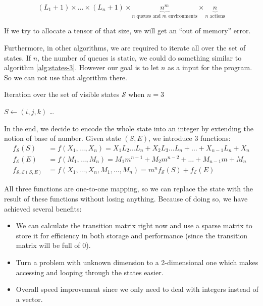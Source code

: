 \documentclass[
  a4paper, xcolor = usenames,dvipsnames]{article}
\providecommand{\tightlist}{%
  \setlength{\itemsep}{0pt}\setlength{\parskip}{0pt}}
\theoremstyle{definition}
\theoremstyle{definition}
\theoremstyle{definition}
\theoremstyle{definition}
\theoremstyle{remark}
\begin{document}
\[
(L_{1} + 1) \times \dots \times (L_{n} + 1) \times \underbrace{n^{m}}_{n \text{ queues and } m \text{ environments}} \times \underbrace{n}_{n \text{ actions}}
\]

If we try to allocate a tensor of that size, we will get an ``out of memory'' error.

Furthermore, in other algorithms, we are required to iterate all over the set of states. If \(n\), the number of queues is static, we could do something similar to algorithm \ref{alg:states-3}. However our goal is to let \(n\) as a input for the program. So we can not use that algorithm there.

\begin{algorithm}
\caption{Iteration over the set of visible states $\mathcal{S}$ when $n = 3$} \label{alg:states-3}
 {
   {
     {
      $S \gets (i, j, k)$\;
      \dots\;
    }
  }
}
\end{algorithm}

In the end, we decide to encode the whole state into an integer by extending the notion of base of number. Given state \((S, E)\), we introduce 3 functions:
\[
\begin{aligned}
f_{\mathcal{S}}(S) &= f(X_{1}, \dots, X_{n}) = X_{1} L_{2} \dots L_{n} + X_{2} L_{3} \dots L_{n} + \dots + X_{n - 1} L_{n} + X_{n} \\
f_{\mathcal{E}}(E) &= f(M_{1}, \dots, M_{n}) = M_{1} m^{n - 1} + M_{2} m^{n - 2} + \dots + M_{n - 1} m + M_{n} \\
f_{\mathcal{S, E}(S, E)} &= f(X_{1}, \dots, X_{n}, M_{1}, \dots, M_{n}) = m^{n} f_{\mathcal{S}}(S) + f_{\mathcal{E}}(E)
\end{aligned}
\]

All three functions are one-to-one mapping, so we can replace the state with the result of these functions without losing anything. Because of doing so, we have achieved several benefits:

\begin{itemize}
\tightlist
\item
  We can calculate the transition matrix right now and use a sparse matrix to store it for efficiency in both storage and performance (since the transition matrix will be full of 0).
\item
  Turn a problem with unknown dimension to a 2-dimensional one which makes accessing and looping through the states easier.
\item
  Overall speed improvement since we only need to deal with integers instead of a vector.
\end{itemize}
\end{document}
